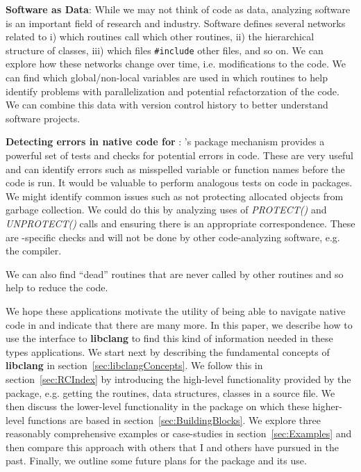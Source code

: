 \documentclass[article]{jss}
\def\C{\proglang{C}}
\def\Cpp{\proglang{C$++$}}
\def\R{\proglang{R}}
\def\Rpkg#1{\pkg{#1}}
\def\Cfunc#1{\textit{#1()}}
\def\libclang{\textbf{libclang}}
\begin{document}
\textbf{Software as Data}: While we may not think of code as data,
analyzing software is an important field of research and industry.
Software defines several networks related to i) which routines call
which other routines, ii) the hierarchical structure of \Cpp{}
classes, iii) which files \texttt{\#include} other files, and so on.
We can explore how these networks change over time, i.e. modifications
to the code. We can find which global/non-local variables are used in
which routines to help identify problems with parallelization and
potential refactorzation of the code.  We can combine this data with
version control history to better understand software projects.


\textbf{Detecting errors in native code for \R}: \R's package
mechanism provides a powerful set of tests and checks for potential
errors in \R{} code.  These are very useful and can identify errors
such as misspelled variable or function names before the code is run.
It would be valuable to perform analogous tests on \C{} code in \R{}
packages.  We might identify common issues such as not protecting
allocated \R{} objects from garbage collection.  We could do this by
analyzing uses of \Cfunc{PROTECT} and \Cfunc{UNPROTECT} calls and
ensuring there is an appropriate correspondence.  These are
\R-specific checks and will not be done by other code-analyzing
software, e.g. the compiler.


We can also find ``dead'' routines that are never called by other
routines and so help to reduce the code.

We hope these applications motivate the utility of being able to
navigate native code in \R{} and indicate that there are many more.  In
this paper, we describe how to use the \R{} interface to \libclang{} to
find this kind of information needed in these types applications.  We
start next by describing the fundamental concepts of \libclang{} in
section~\ref{sec:libclangConcepts}.  We follow this in
section~\ref{sec:RCIndex} by introducing the high-level functionality
provided by the \Rpkg{RCIndex} package, e.g. getting the routines,
data structures, \Cpp{} classes in a source file.  We then discuss the
lower-level functionality in the package on which these higher-level
functions are based in section~\ref{sec:BuildingBlocks}. 
 We explore
three reasonably comprehensive examples or case-studies in
section~\ref{sec:Examples} and then compare this approach with others
that I and others have pursued in the past.  Finally, we outline some
future plans for the package and its use.
\end{document}
